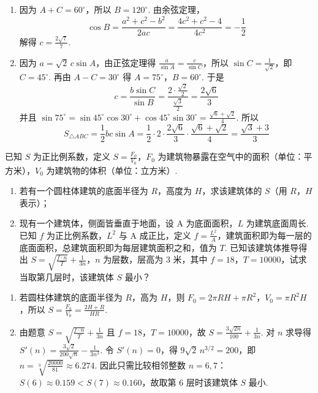 \begin{solution}
\begin{enumerate}
\item 因为 \(A+C=60^\circ\)，所以 \(B=120^\circ\). 由余弦定理，
\[
\cos B=\frac{a^2+c^2-b^2}{2ac}
=\frac{4c^2+c^2-4}{4c^2}=-\frac12
\]
解得 \(c=\frac{2\sqrt7}{7}\).

\item 因为 \(a=\sqrt2\,c\sin A\)，由正弦定理得 \(\frac{a}{\sin A}=\frac{c}{\sin C}\)，所以 \(\sin C=\frac{1}{\sqrt2}\)，即 \(C=45^\circ\). 再由 \(A-C=30^\circ\) 得 \(A=75^\circ\)，\(B=60^\circ\). 于是
\[
c=\frac{b\sin C}{\sin B}=\frac{2\cdot \frac{\sqrt2}{2}}{\frac{\sqrt3}{2}}=\frac{2\sqrt6}{3}
\]
并且 \(\sin75^\circ=\sin45^\circ\cos30^\circ+\cos45^\circ\sin30^\circ=\frac{\sqrt6+\sqrt2}{4}\).
所以
\[
S_{\triangle ABC}=\frac12 bc\sin A
=\frac12\cdot 2\cdot \frac{2\sqrt6}{3}\cdot \frac{\sqrt6+\sqrt2}{4}
=\frac{\sqrt3+3}{3}
\]
\end{enumerate}
\end{solution}

\begin{problem}
已知 \(S\) 为正比例系数，定义 \(S=\frac{F_0}{V_0}\)，\(F_0\) 为建筑物暴露在空气中的面积（单位：平方米），\(V_0\) 为建筑物的体积（单位：立方米）.

\begin{enumerate}
\item 若有一个圆柱体建筑的底面半径为 \(R\)，高度为 \(H\)，求该建筑体的 \(S\)（用 \(R\)，\(H\) 表示）；
\item 现有一个建筑体，侧面皆垂直于地面，设 A 为底面面积，\(L\) 为建筑底面周长. 已知 \(f\) 为正比例系数，\(L^2\) 与 A 成正比，定义 \(f=\frac{L^2}{A}\)，建筑面积即为每一层的底面面积，总建筑面积即为每层建筑面积之和，值为 \(T\). 已知该建筑体推导得出 \(S=\sqrt{\frac{f\cdot n}{T}}+\frac{1}{3n}\)，\(n\) 为层数，层高为 \(3\) 米，其中 \(f=18\)，\(T=10000\)，试求当取第几层时，该建筑体 \(S\) 最小？
\end{enumerate}
\end{problem}

\begin{solution}
\begin{enumerate}
\item 若圆柱体建筑的底面半径为 \(R\)，高为 \(H\)，则 \(F_0=2\pi RH+\pi R^2\)，\(V_0=\pi R^2H\)，所以 \(S=\frac{F_0}{V_0}=\frac{2H+R}{HR}\).

\item 由题意 \(S=\sqrt{\frac{f\cdot n}{T}}+\frac{1}{3n}\) 且 \(f=18\)，\(T=10000\)，故 \(S=\frac{3\sqrt{2n}}{100}+\frac{1}{3n}\). 对 \(n\) 求导得 \(S'(n)=\frac{3\sqrt2}{200\sqrt n}-\frac{1}{3n^2}\). 令 \(S'(n)=0\)，得 \(9\sqrt2\,n^{3/2}=200\)，即 \(n=\sqrt[3]{\frac{20000}{81}}\approx6.274\). 因此只需比较相邻整数 \(n=6,7\)：\(S(6)\approx0.159<S(7)\approx0.160\)，故取第 \(6\) 层时该建筑体 \(S\) 最小.
\end{enumerate}
\end{solution}

